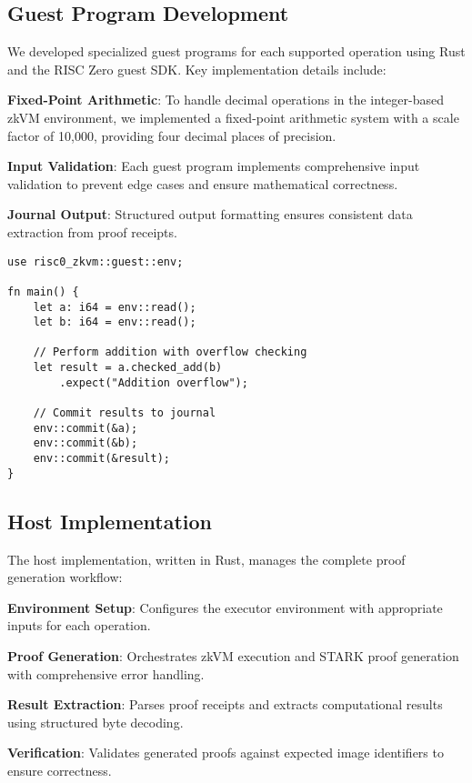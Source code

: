 \documentclass[11pt]{article}
\begin{document}
\subsection{Guest Program Development}

We developed specialized guest programs for each supported operation using Rust and the RISC Zero guest SDK. Key implementation details include:

\textbf{Fixed-Point Arithmetic}: To handle decimal operations in the integer-based zkVM environment, we implemented a fixed-point arithmetic system with a scale factor of 10,000, providing four decimal places of precision.

\textbf{Input Validation}: Each guest program implements comprehensive input validation to prevent edge cases and ensure mathematical correctness.

\textbf{Journal Output}: Structured output formatting ensures consistent data extraction from proof receipts.

\begin{lstlisting}[caption=Example Guest Program for Addition,label=lst:guest]
use risc0_zkvm::guest::env;

fn main() {
    let a: i64 = env::read();
    let b: i64 = env::read();
    
    // Perform addition with overflow checking
    let result = a.checked_add(b)
        .expect("Addition overflow");
    
    // Commit results to journal
    env::commit(&a);
    env::commit(&b); 
    env::commit(&result);
}
\end{lstlisting}

\subsection{Host Implementation}

The host implementation, written in Rust, manages the complete proof generation workflow:

\textbf{Environment Setup}: Configures the executor environment with appropriate inputs for each operation.

\textbf{Proof Generation}: Orchestrates zkVM execution and STARK proof generation with comprehensive error handling.

\textbf{Result Extraction}: Parses proof receipts and extracts computational results using structured byte decoding.

\textbf{Verification}: Validates generated proofs against expected image identifiers to ensure correctness.
\end{document}
